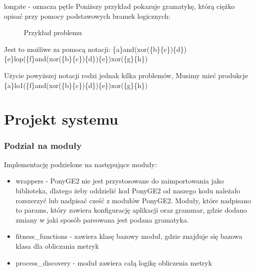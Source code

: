 longate - oznacza pętle 
Poniższy przykład pokazuje gramatykę, którą ciężko opisać przy pomocy podstawowych bramek logicznych: 
\begin{figure}[h]
	\caption{\label{fig:subcaption_example}Przykład problemu}
\end{figure}

Jest to możliwe za pomocą notacji: 
\{a\}and(xor(\{b\}\{c\})\{d\})\{e\}lop(\{f\}and(xor(\{b\}\{c\})\{d\})\{e\})xor(\{g\}\{h\})

Użycie powyższej notacji rodzi jednak kilka problemów, Musimy mieć produkcje 
\{a\}lo1(\{f\}and(xor(\{b\}\{c\})\{d\})\{e\})xor(\{g\}\{h\})
\clearpage

\section{Projekt systemu}

\subsubsection{Podział na moduły}

Implementację podzielone na następujące moduły:
\begin{itemize}
    \item wrappers - PonyGE2 nie jest przystosowane do zaimportowania jako biblioteka, dlatego żeby oddzielić kod PonyGE2 od naszego kodu należało rozszerzyć lub nadpisać cześć z modułów PonyGE2. Moduły, które nadpisano to params, który zawiera konfigurację aplikacji oraz grammar, gdzie dodano zmiany w jaki sposób parsowana jest podana gramatyka. 
  \item fitness{\_}functions - zawiera klasę bazowy moduł, gdzie znajduje się bazowa klasa dla obliczania metryk
  \item process{\_}discovery - moduł zawiera całą logikę obliczenia metryk
\end{itemize}



